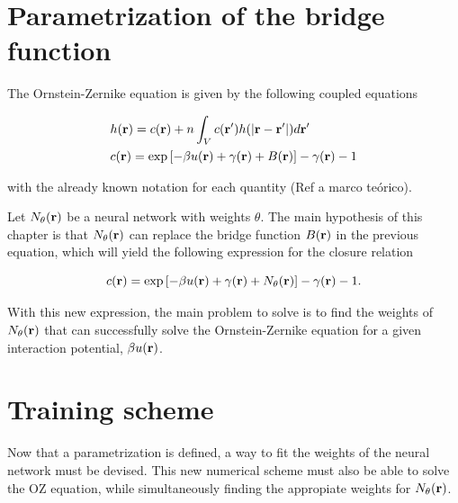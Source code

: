 \section{Parametrization of the bridge function}

The Ornstein-Zernike equation is given by the following coupled equations

\begin{subequations}
    \begin{align*}
         & h(\mathbf{r}) = c(\mathbf{r}) +
        n \int_{V}
        c(\mathbf{r}^{\prime})
        h(\lvert \mathbf{r} - \mathbf{r}^{\prime} \rvert)
        d\mathbf{r}^{\prime} \label{eq:oz1} \\
         & c(\mathbf{r})
        = \exp{\left[
                -  \beta u(\mathbf{r})
                +  \gamma(\mathbf{r})
                + B(\mathbf{r})
                \right]} -
        \gamma(\mathbf{r})
        - 1
    \end{align*}
\end{subequations}

with the already known notation for each quantity (Ref a marco teórico).

Let $N_{\theta}(\mathbf{r})$ be a neural network with weights $\theta$. The main hypothesis
of this chapter is that $N_{\theta}(\mathbf{r})$ can replace the bridge function $B(\mathbf{r})$
in the previous equation, which will yield the following expression for
the closure relation

\begin{equation}
    c(\mathbf{r}) = \exp{\left[
            -  \beta u(\mathbf{r})
            +  \gamma(\mathbf{r})
            + N_{\theta}(\mathbf{r})\right]} -
    \gamma(\mathbf{r})
    - 1 .
    \label{eq:parametrizacion}
\end{equation}

With this new expression, the main problem to solve is to find the weights
of $N_{\theta}(\mathbf{r})$ that can successfully solve the Ornstein-Zernike equation
for a given interaction potential, $\beta u(\mathbf{r})$.


\section{Training scheme}
Now that a parametrization is defined, a way to fit the weights of the neural network must
be devised. This new numerical scheme must also be able to solve the OZ equation, while
simultaneously finding the appropiate weights for $N_{\theta}(\mathbf{r})$.

